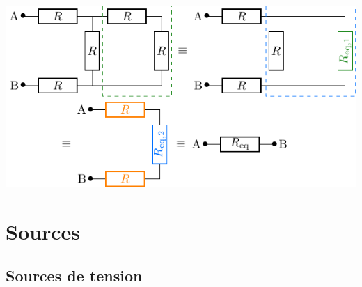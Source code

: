 \documentclass[../../main/main.tex]{subfiles}
\begin{document}
\begin{tcb}[sidebyside, lefthand ratio=.4, sidebyside align=top]
\begin{center}
{		}{
			\includegraphics[width=\linewidth]{exer_rasso}
		}
	\end{center}
\end{tcb}

\section{Sources}
\subsection{Sources de tension}
\end{document}
